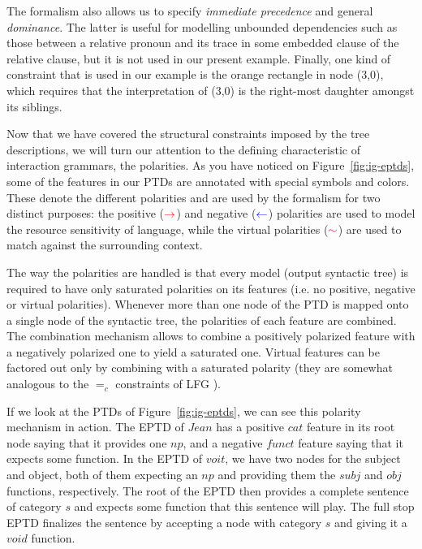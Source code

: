 The formalism also allows us to specify \emph{immediate precedence} and
general \emph{dominance}. The latter is useful for modelling unbounded
dependencies such as those between a relative pronoun and its trace in
some embedded clause of the relative clause, but it is not used in our
present example. Finally, one kind of constraint that is used in our
example is the orange rectangle in node (3,0), which requires that the
interpretation of (3,0) is the right-most daughter amongst its siblings.

Now that we have covered the structural constraints imposed by the tree
descriptions, we will turn our attention to the defining characteristic
of interaction grammars, the polarities. As you have noticed on
Figure~\ref{fig:ig-eptds}, some of the features in our PTDs are
annotated with special symbols and colors. These denote the different
polarities and are used by the formalism for two distinct purposes: the
positive ($\textcolor{red}{\rightarrow}$) and negative
($\textcolor{blue}{\leftarrow}$) polarities are used to model the
resource sensitivity of language, while the virtual polarities
($\textcolor{purple}{\sim}$) are used to match against the
surrounding context.

The way the polarities are handled is that every model (output syntactic
tree) is required to have only saturated polarities on its features
(i.e. no positive, negative or virtual polarities). Whenever more than
one node of the PTD is mapped onto a single node of the syntactic tree,
the polarities of each feature are combined. The combination mechanism
allows to combine a positively polarized feature with a negatively
polarized one to yield a saturated one. Virtual features can be factored
out only by combining with a saturated polarity (they are somewhat
analogous to the $=_{c}$ constraints of LFG \cite{kaplan1982lexical}).

If we look at the PTDs of Figure~\ref{fig:ig-eptds}, we can see this
polarity mechanism in action. The EPTD of $Jean$ has a positive $cat$
feature in its root node saying that it provides one $np$, and a
negative $funct$ feature saying that it expects some function. In the
EPTD of $voit$, we have two nodes for the subject and object, both of
them expecting an $np$ and providing them the $subj$ and $obj$
functions, respectively. The root of the EPTD then provides a complete
sentence of category $s$ and expects some function that this sentence
will play. The full stop EPTD finalizes the sentence by accepting a node
with category $s$ and giving it a $void$ function.

